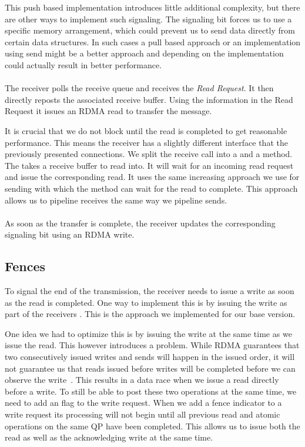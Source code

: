 This push based implementation introduces little additional complexity, but there are other ways to implement such 
signaling. The signaling bit forces us to use a specific memory arrangement, which could prevent us to send data directly 
from certain data structures. In such cases a pull based approach or an implementation using send might be a better approach
and depending on the implementation could actually result in better performance.

\paragraph{} The receiver polls the receive queue and receives the \emph{Read Request}. It then directly reposts the associated 
receive buffer. Using the information in the Read Request it issues an RDMA read to transfer the message. 


It is crucial that we do not block until the read is completed to get reasonable performance.  This means the receiver has a
slightly different interface that the previously presented connections. We split the receive call into a 
 and a  method. The  takes a receive buffer
to read into. It will wait for an incoming read request and issue the corresponding read. It uses the same increasing 
 approach we use for sending with which the  method can wait for the read to complete. This approach
allows us to pipeline receives the same way we pipeline sends.

\paragraph{} As soon as the transfer is complete, the receiver updates the corresponding signaling bit using an RDMA write.

\subsection{Fences}

To signal the end of the transmission, the receiver needs to issue a write as soon as the read is completed. One way to 
implement this is by issuing the write as part of the receivers . This is the approach we implemented for our
base version.

One idea we had to optimize this is by issuing the write at the same time as we issue the read. This however introduces a 
problem. While RDMA guarantees that two consecutively issued writes and sends will happen in the issued order, 
it will not guarantee us that reads issued before writes will be completed before we can observe the write~\cite{rdma-reference}.
This results in a data race when we issue a read directly before a write. To still be able to post these two operations 
at the same time, we need to add an  flag to the write request. When we add a fence indicator to a write
request its processing will not begin until all previous read and atomic operations on the same QP  have been completed. This 
allows us to issue both the read as well as the acknowledging write at the same time.

